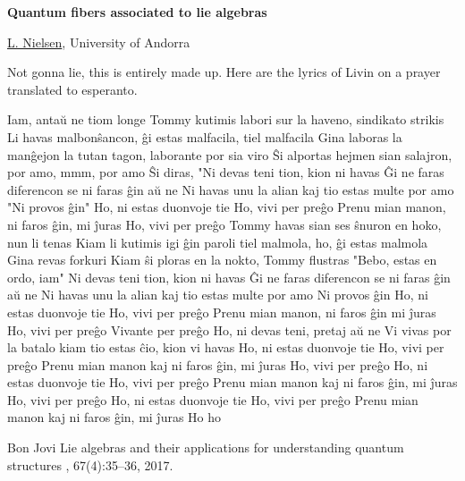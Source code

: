 \documentclass[a4paper, 11pt]{article}
\newcommand{\abstracttitle}[1]{{
    \centering
    \LARGE \textbf{#1}\\
    \vspace*{0.7cm}
}}
\newcommand{\firstauthor}[2]{{
    \centering
    \underline{#1}, \textsf{#2}\\
    \vspace*{0.25cm}
}}
\newcommand{\abstracttext}[1]{
    \vspace{0.6cm}
    #1
}
\begin{document}
\abstracttitle{Quantum fibers associated to lie algebras}

\firstauthor{L. Nielsen}{University of Andorra}

\abstracttext{
    Not gonna lie, this is entirely made up. Here are the lyrics of Livin on a prayer translated to esperanto.

Iam, antaŭ ne tiom longe
Tommy kutimis labori sur la haveno, sindikato strikis
Li havas malbonŝancon, ĝi estas malfacila, tiel malfacila
Gina laboras la manĝejon la tutan tagon, laborante por sia viro
Ŝi alportas hejmen sian salajron, por amo, mmm, por amo
Ŝi diras, "Ni devas teni tion, kion ni havas
Ĝi ne faras diferencon se ni faras ĝin aŭ ne
Ni havas unu la alian kaj tio estas multe por amo
"Ni provos ĝin"
Ho, ni estas duonvoje tie
Ho, vivi per preĝo
Prenu mian manon, ni faros ĝin, mi ĵuras
Ho, vivi per preĝo
Tommy havas sian ses ŝnuron en hoko, nun li tenas
Kiam li kutimis igi ĝin paroli tiel malmola, ho, ĝi estas malmola
Gina revas forkuri
Kiam ŝi ploras en la nokto, Tommy flustras
"Bebo, estas en ordo, iam"
Ni devas teni tion, kion ni havas
Ĝi ne faras diferencon se ni faras ĝin aŭ ne
Ni havas unu la alian kaj tio estas multe por amo
Ni provos ĝin
Ho, ni estas duonvoje tie
Ho, vivi per preĝo
Prenu mian manon, ni faros ĝin mi ĵuras
Ho, vivi per preĝo
Vivante per preĝo
Ho, ni devas teni, pretaj aŭ ne
Vi vivas por la batalo kiam tio estas ĉio, kion vi havas
Ho, ni estas duonvoje tie
Ho, vivi per preĝo
Prenu mian manon kaj ni faros ĝin, mi ĵuras
Ho, vivi per preĝo
Ho, ni estas duonvoje tie
Ho, vivi per preĝo
Prenu mian manon kaj ni faros ĝin, mi ĵuras
Ho, vivi per preĝo
Ho, ni estas duonvoje tie
Ho, vivi per preĝo
Prenu mian manon kaj ni faros ĝin, mi ĵuras
Ho ho
}

\begin{thebibliography}{9}
Bon Jovi
\newblock Lie algebras and their applications for understanding quantum structures
, 67(4):35--36, 2017.
\end{thebibliography}
\end{document}
